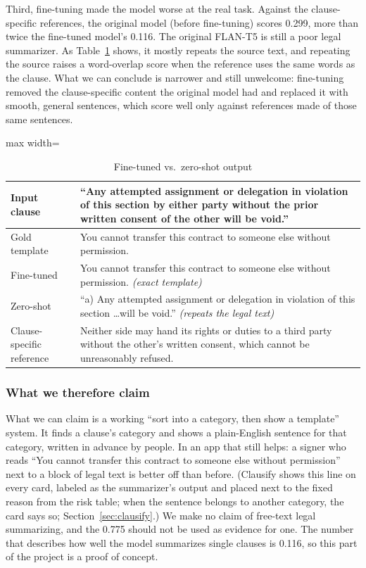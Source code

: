 Third, fine-tuning made the model worse at the real task. Against the clause-specific references, the original model (before fine-tuning) scores 0.299, more than twice the fine-tuned model's 0.116. The original FLAN-T5 is still a poor legal summarizer. As Table~\ref{tab:sumqual} shows, it mostly repeats the source text, and repeating the source raises a word-overlap score when the reference uses the same words as the clause. What we can conclude is narrower and still unwelcome: fine-tuning removed the clause-specific content the original model had and replaced it with smooth, general sentences, which score well only against references made of those same sentences.

\begin{table}[!htbp]
\centering
\caption{Fine-tuned vs.\ zero-shot output}
\label{tab:sumqual}
\small
\begin{adjustbox}{max width=\textwidth}
\begin{tabular}{>{\raggedright\arraybackslash}p{3.2cm} >{\raggedright\arraybackslash}p{10.3cm}}
\toprule
\textbf{Input clause} & ``Any attempted assignment or delegation in violation of this section by either party without the prior written consent of the other will be void.''\\
\midrule
Gold template & You cannot transfer this contract to someone else without permission.\\
Fine-tuned    & You cannot transfer this contract to someone else without permission. \emph{(exact template)}\\
Zero-shot     & ``a) Any attempted assignment or delegation in violation of this section \ldots will be void.'' \emph{(repeats the legal text)}\\
\midrule
Clause-specific reference & Neither side may hand its rights or duties to a third party without the other's written consent, which cannot be unreasonably refused.\\
\bottomrule
\end{tabular}
\end{adjustbox}
\end{table}

\subsubsection{What we therefore claim}
What we can claim is a working ``sort into a category, then show a template'' system. It finds a clause's category and shows a plain-English sentence for that category, written in advance by people. In an app that still helps: a signer who reads ``You cannot transfer this contract to someone else without permission'' next to a block of legal text is better off than before. (Clausify shows this line on every card, labeled as the summarizer's output and placed next to the fixed reason from the risk table; when the sentence belongs to another category, the card says so; Section~\ref{sec:clausify}.) We make no claim of free-text legal summarizing, and the 0.775 should not be used as evidence for one. The number that describes how well the model summarizes single clauses is 0.116, so this part of the project is a proof of concept.

